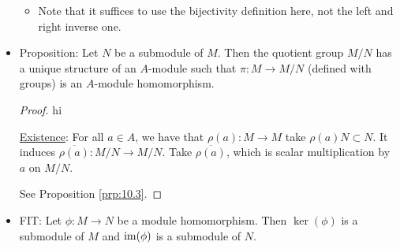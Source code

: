 \documentclass[../notes.tex]{subfiles}
\begin{document}
\begin{itemize}
\begin{itemize}
        \item Note that it suffices to use the bijectivity definition here, not the left and right inverse one.
    \end{itemize}
    \item Proposition: Let $N$ be a submodule of $M$. Then the quotient group $M/N$ has a unique structure of an $A$-module such that $\pi:M\to M/N$ (defined with groups) is an $A$-module homomorphism.
    \begin{proof}
        {\color{white}hi}\par
        \underline{Existence}: For all $a\in A$, we have that $\rho(a):M\to M$ take $\rho(a)N\subset N$. It induces $\overline{\rho(a)}:M/N\to M/N$. Take $\overline{\rho(a)}$, which is scalar multiplication by $a$ on $M/N$.\par
        See Proposition \ref{prp:10.3}.
    \end{proof}
    \item FIT: Let $\phi:M\to N$ be a module homomorphism. Then $\ker(\phi)$ is a submodule of $M$ and $\operatorname{im}(\phi)$ is a submodule of $N$.
    \begin{figure}[H]
        \centering
\end{figure}
\end{itemize}
\end{document}
